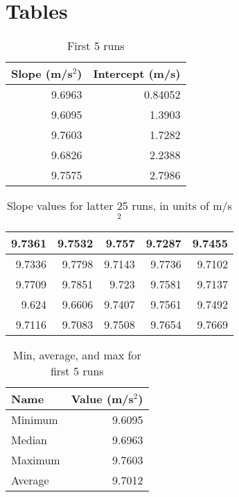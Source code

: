 \section{Tables}
\begin{table}[ht]
    \centering
    \begin{tabular}{|r|r|}
        \hline
        \textbf{Slope} (m/s$^{2}$) & \textbf{Intercept} (m/s) \\
        \hline
        9.6963 & 0.84052 \\
        9.6095 & 1.3903 \\
        9.7603 & 1.7282 \\
        9.6826 & 2.2388 \\
        9.7575 & 2.7986 \\
        \hline
    \end{tabular}
    \caption{First 5 runs}
    \label{table:01.first.5}
\end{table}
\begin{table}[ht]
    \centering
    \begin{tabular}{|r|r|r|r|r|}
        \hline
        9.7361 & 9.7532 & 9.757 & 9.7287 & 9.7455 \\
        \hline
        9.7336 & 9.7798 & 9.7143 & 9.7736 & 9.7102 \\
        \hline
        9.7709 & 9.7851 & 9.723 & 9.7581 & 9.7137 \\
        \hline
        9.624 & 9.6606 & 9.7407 & 9.7561 & 9.7492 \\
        \hline
        9.7116 & 9.7083 & 9.7508 & 9.7654 & 9.7669 \\
        \hline
    \end{tabular}
    \caption{Slope values for latter 25 runs, in units of m/s$^{2}$}
    \label{table:01.latter.25}
\end{table}
\begin{table}[ht]
    \centering
    \begin{tabular}{|l|r|}
        \hline
        \textbf{Name} & \textbf{Value} (m/s$^{2}$) \\
        \hline
        Minimum & 9.6095 \\
        Median & 9.6963 \\
        Maximum & 9.7603 \\
        Average & 9.7012 \\
        \hline
    \end{tabular}
    \caption{Min, average, and max for first 5 runs}
    \label{table:01.m.a.m.5}
\end{table}
